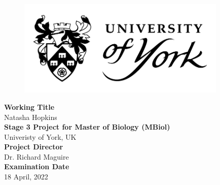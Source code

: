 \documentclass[
  12pt,
]{article}
\author{}
\date{\vspace{-2.5em}}
\begin{document}
\captionsetup{justification=raggedright,singlelinecheck=false}

\begin{center}
\begin{figure}[h!]
\centering
  \includegraphics[width=10cm]{../images/uoy_logo.png}
  \label{}
\end{figure}
\vspace*{2\baselineskip}
\Large{\textbf{Working Title}}\\
Natasha Hopkins\\
\vspace*{2\baselineskip}
\Large{\textbf{Stage 3 Project for Master of Biology (MBiol)}}\\
\Large{Univeristy of York, UK}\\
\vspace*{2\baselineskip}
\Large{\textbf{Project Director}}\\
Dr. Richard Maguire\\
\vspace*{2\baselineskip}
\Large{\textbf{Examination Date}}\\
18 April, 2022
\end{center}

\hypersetup{linkcolor = black}
\newpage
\tableofcontents
\hypersetup{linkcolor = teal}
\end{document}
